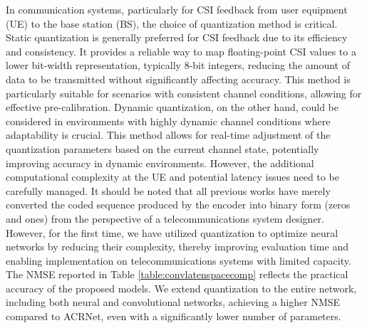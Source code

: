 \documentclass[lettersize,journal]{IEEEtran}
\begin{document}
In communication systems, particularly for CSI feedback from user equipment (UE) to the base station (BS), the choice of quantization method is critical. Static quantization is generally preferred for CSI feedback due to its efficiency and consistency. It provides a reliable way to map floating-point CSI values to a lower bit-width representation, typically 8-bit integers, reducing the amount of data to be transmitted without significantly affecting accuracy. This method is particularly suitable for scenarios with consistent channel conditions, allowing for effective pre-calibration.
Dynamic quantization, on the other hand, could be considered in environments with highly dynamic channel conditions where adaptability is crucial. This method allows for real-time adjustment of the quantization parameters based on the current channel state, potentially improving accuracy in dynamic environments. However, the additional computational complexity at the UE and potential latency issues need to be carefully managed.
It should be noted that all previous works have merely converted the coded sequence produced by the encoder into binary form (zeros and ones) from the perspective of a telecommunications system designer. However, for the first time, we have utilized quantization to optimize neural networks by reducing their complexity, thereby improving evaluation time and enabling implementation on telecommunications systems with limited capacity.
The NMSE reported in Table \ref{table:convlatenspacecomp} reflects the practical accuracy of the proposed models. We extend quantization to the entire network, including both neural and convolutional networks, achieving a higher NMSE compared to ACRNet, even with a significantly lower number of parameters.
\end{document}
